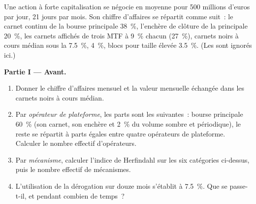 \begin{problem}\label{pb:m1:european-equity-market-structure:1}
Une action à forte capitalisation se négocie en moyenne pour 500 millions d'euros par jour, 21
jours par mois. Son chiffre d'affaires se répartit comme suit~: le carnet continu de la
bourse principale 38~\%, l'enchère de clôture de la principale 20~\%, les carnets affichés de trois MTF à 9~\% chacun (27~\%),
carnets noirs à cours médian sous la  7.5~\%, 
4~\%, blocs pour taille élevée 3.5~\%. (Les  sont ignorés
ici.)

\medskip\noindent\textbf{Partie I --- Avant.}
\begin{enumerate}
\item Donner le chiffre d'affaires mensuel et la valeur mensuelle échangée dans les
carnets noirs à cours médian.
\item Par \emph{opérateur de plateforme}, les parts sont les suivantes~: bourse principale 60~\% (son carnet, son
enchère et 2~\% du volume sombre et périodique), le reste se répartit à parts égales
entre quatre opérateurs de plateforme. Calculer le nombre effectif d'opérateurs.
\item Par \emph{mécanisme}, calculer l'indice de Herfindahl sur les six
catégories ci-dessus, puis le nombre effectif de mécanismes.
\item L'utilisation de la dérogation sur douze mois s'établit à 7.5~\%. Que se passe-t-il, et
pendant combien de temps~?
\end{enumerate}


\end{problem}
